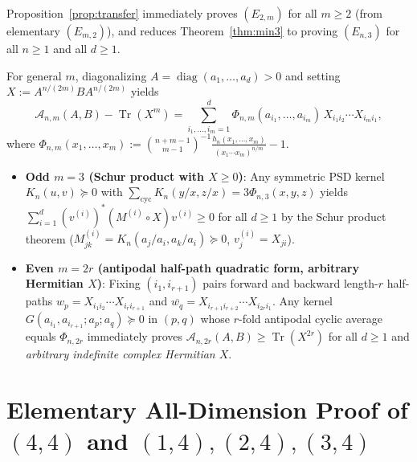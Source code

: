 \documentclass[11pt,a4paper]{article}
\theoremstyle{remark}
\newcommand{\Tr}{\operatorname{Tr}}
\begin{document}
Proposition~\ref{prop:transfer} immediately proves $(E_{2,m})$ for all $m\ge 2$ (from elementary $(E_{m,2})$), and reduces Theorem~\ref{thm:min3} to proving $(E_{n,3})$ for all $n\ge 1$ and all $d\ge 1$.

For general $m$, diagonalizing $A=\operatorname{diag}(a_1,\dots,a_d)>0$ and setting $X:=A^{n/(2m)}BA^{n/(2m)}$ yields
\begin{equation}\label{eq:general_m_sum}
  \mathcal{A}_{n,m}(A,B) - \Tr(X^m) = \sum_{i_1,\dots,i_m=1}^d \Phi_{n,m}(a_{i_1},\dots,a_{i_m})\, X_{i_1 i_2}\cdots X_{i_m i_1},
\end{equation}
where $\Phi_{n,m}(x_1,\dots,x_m) := \binom{n+m-1}{m-1}^{-1}\frac{h_n(x_1,\dots,x_m)}{(x_1\cdots x_m)^{n/m}} - 1$.
\begin{itemize}
  \item \textbf{Odd $m=3$ (Schur product with $X\ge 0$)}: Any symmetric PSD kernel $K_n(u,v)\succeq 0$ with $\sum_{\mathrm{cyc}} K_n(y/x,z/x) = 3\Phi_{n,3}(x,y,z)$ yields $\sum_{i=1}^d (v^{(i)})^*(M^{(i)}\circ X)v^{(i)}\ge 0$ for all $d\ge 1$ by the Schur product theorem ($M^{(i)}_{jk}=K_n(a_j/a_i,a_k/a_i)\succeq 0$, $v^{(i)}_j = X_{ji}$).
  \item \textbf{Even $m=2r$ (antipodal half-path quadratic form, arbitrary Hermitian $X$)}: Fixing $(i_1,i_{r+1})$ pairs forward and backward length-$r$ half-paths $w_p = X_{i_1 i_2}\cdots X_{i_r i_{r+1}}$ and $\overline{w_q} = X_{i_{r+1}i_{r+2}}\cdots X_{i_{2r}i_1}$. Any kernel $G(a_{i_1},a_{i_{r+1}}; a_p; a_q)\succeq 0$ in $(p,q)$ whose $r$-fold antipodal cyclic average equals $\Phi_{n,2r}$ immediately proves $\mathcal{A}_{n,2r}(A,B)\ge\Tr(X^{2r})$ for all $d\ge 1$ and \emph{arbitrary indefinite complex Hermitian $X$}.
\end{itemize}

\section{Elementary All-Dimension Proof of $(4,4)$ and $(1,4),(2,4),(3,4)$}
\end{document}
